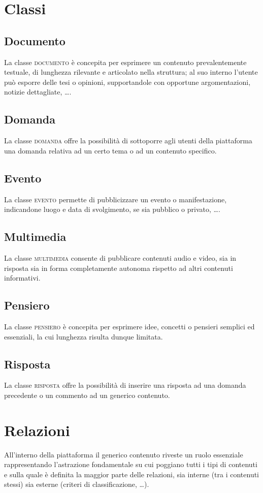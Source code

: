 \documentclass[10pt,a4paper,headinclude,footinclude,hidelinks]{scrreprt} %
\begin{document}
	\section{Classi}

	\subsection{Documento}
	La classe \textsc{documento} è concepita per esprimere un contenuto prevalentemente testuale, di lunghezza rilevante e articolato nella struttura; al suo interno l'utente può esporre delle tesi o opinioni, supportandole con opportune argomentazioni, notizie dettagliate, \ldots.
	\subsection{Domanda}
	La classe \textsc{domanda} offre la possibilità di sottoporre agli utenti della piattaforma una domanda relativa ad un certo tema o ad un contenuto specifico.
	\subsection{Evento}
	La classe \textsc{evento} permette di pubblicizzare un evento o manifestazione, indicandone luogo e data di svolgimento, se sia pubblico o privato, \ldots.
	\subsection{Multimedia}
	La classe \textsc{multimedia} consente di pubblicare contenuti audio e video, sia in risposta sia in forma completamente autonoma rispetto ad altri contenuti informativi.
	\subsection{Pensiero}
	La classe \textsc{pensiero} è concepita per esprimere idee, concetti o pensieri semplici ed essenziali, la cui lunghezza risulta dunque limitata.
	\subsection{Risposta}
	La classe \textsc{risposta} offre la possibilità di inserire una risposta ad una domanda precedente o un commento ad un generico contenuto.
	
	\section{Relazioni}
	\label{sec:stage:cls:contenuti:relazioni}
	All'interno della piattaforma il generico contenuto riveste un ruolo essenziale rappresentando l'astrazione fondamentale su cui poggiano tutti i tipi di contenuti e sulla quale è definita la maggior parte delle relazioni, sia interne (tra i contenuti stessi) sia esterne (criteri di classificazione, \ldots).
\end{document}
